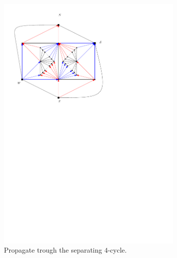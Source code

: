 \begin{figure}[h]
\begin{subfigure}[t]{0.3\textwidth}
      \includegraphics[width=\textwidth]{fixExtension/img/manymany2}
      \caption{Propagate trough the separating $4$-cycle.}
      \label{fig:fix:manymany2}
    \end{subfigure}
    \quad
    \begin{subfigure}[t]{0.3\textwidth}

\end{subfigure}
\end{figure}

